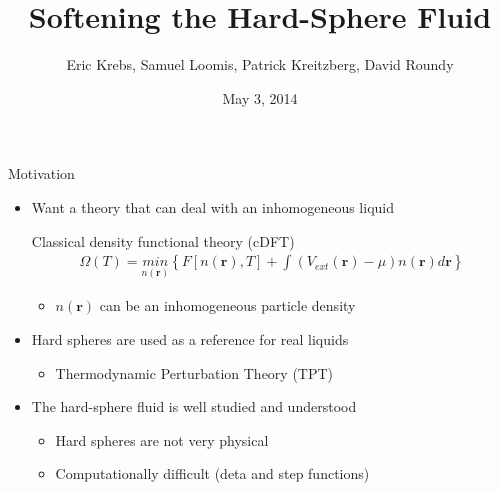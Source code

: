 \documentclass{beamer}
\title{Softening the Hard-Sphere Fluid}
\author{Eric Krebs, Samuel Loomis, Patrick Kreitzberg, David Roundy}
\institute{Oregon State University}
\date{May 3, 2014}
\newcommand{\rr}{\textbf{r}}
\begin{document}
\begin{frame}
 \titlepage
\end{frame}

\begin{frame}{Motivation}
  \begin{itemize}
    \item Want a theory that can deal with an inhomogeneous liquid
      \begin{block}{Classical density functional theory (cDFT)}
        \begin{align}
          \Omega(T) = \underset{n(\rr)}{min} \left\{F[n(\rr),T] + \int
          \left(V_{ext}(\rr) - \mu \right)n(\rr)d\rr \right\}
        \end{align}
        \begin{itemize}
        \item $n(\rr)$ can be an inhomogeneous particle density
        \end{itemize}
      \end{block}
    \item Hard spheres are used as a reference for real liquids
      \begin{itemize}
        \item Thermodynamic Perturbation Theory (TPT)
      \end{itemize}
    \item The hard-sphere fluid is well studied and understood
      \begin{itemize}
        \item Hard spheres are not very physical
        \item Computationally difficult (deta and step functions)
      \end{itemize}
  \end{itemize}
\end{frame}
\end{document}

